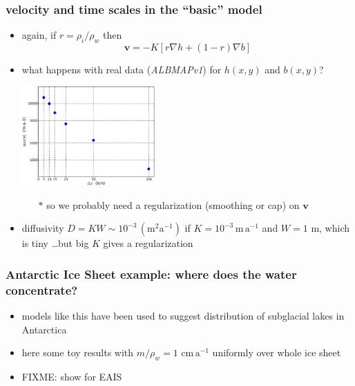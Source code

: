\documentclass[hide notes,intlimits]{beamer}
\begin{document}
\begin{frame}
  \frametitle{velocity and time scales in the ``basic'' model}

  \begin{itemize}
    \item again, if $r = \rho_i/\rho_w$ then
      $$\mathbf{v} = - K \left[r \nabla h + (1-r) \nabla b\right]$$
    \item what happens with real data (\emph{ALBMAPv1}) for $h(x,y)$ and $b(x,y)$?
    \begin{center}
    \medskip
     \qquad \includegraphics[width=0.4\textwidth]{figs/vresults}
    \medskip
    \end{center}
       \small
       \begin{itemize}
       \item[$\ast$] so we probably need a regularization (smoothing or cap) on $\mathbf{v}$
       \end{itemize}
       \normalsize
    \item diffusivity $D = K W \sim 10^{-3} \, (\text{m}^2 \text{a}^{-1})$ if $K=10^{-3} \,\text{m}\,\text{a}^{-1}$ and $W=1$ m, which is tiny \small \dots but big $K$ gives a regularization
  \end{itemize}

\end{frame}


\begin{frame}
  \frametitle{Antarctic Ice Sheet example: where does the water concentrate?}

  \begin{itemize}
    \item models like this have been used to suggest distribution of subglacial lakes in Antarctica
    \item here some toy results with $m/\rho_w = 1 \,\,\text{cm}\,\text{a}^{-1}$ uniformly over whole ice sheet
    \item FIXME: show for EAIS
  \end{itemize}

\end{frame}
\end{document}

